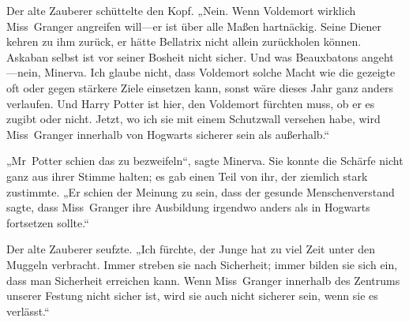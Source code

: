 Der alte Zauberer schüttelte den Kopf.
„Nein. Wenn Voldemort wirklich Miss~Granger angreifen will—er ist über alle Maßen hartnäckig. Seine Diener kehren zu ihm zurück, er hätte Bellatrix nicht allein zurückholen können. Askaban selbst ist vor seiner Bosheit nicht sicher. Und was Beauxbatons angeht—nein, Minerva. Ich glaube nicht, dass Voldemort solche Macht wie die gezeigte oft oder gegen stärkere Ziele einsetzen kann, sonst wäre dieses Jahr ganz anders verlaufen. Und Harry Potter ist hier, den Voldemort fürchten muss, ob er es zugibt oder nicht. Jetzt, wo ich sie mit einem Schutzwall versehen habe, wird Miss~Granger innerhalb von Hogwarts sicherer sein als außerhalb.“

„Mr~Potter schien das zu bezweifeln“, sagte Minerva. Sie konnte die Schärfe nicht ganz aus ihrer Stimme halten; es gab einen Teil von ihr, der ziemlich stark zustimmte. „Er schien der Meinung zu sein, dass der gesunde Menschenverstand sagte, dass Miss~Granger ihre Ausbildung irgendwo anders als in Hogwarts fortsetzen sollte.“

Der alte Zauberer seufzte.
„Ich fürchte, der Junge hat zu viel Zeit unter den Muggeln verbracht. Immer streben sie nach Sicherheit; immer bilden sie sich ein, dass man Sicherheit erreichen kann. Wenn Miss~Granger innerhalb des Zentrums unserer Festung nicht sicher ist, wird sie auch nicht sicherer sein, wenn sie es verlässt.“

